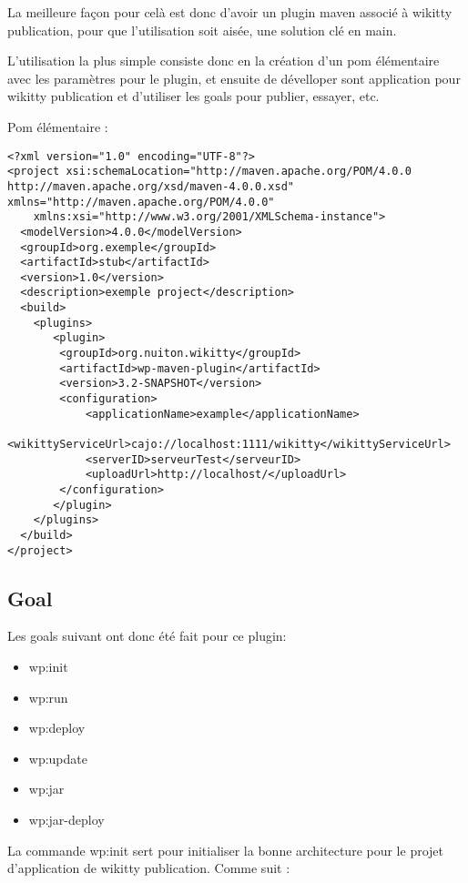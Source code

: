 La meilleure façon pour celà est donc d'avoir un plugin maven associé à 
wikitty publication, pour que l'utilisation soit aisée, une solution clé en 
main.

L'utilisation la plus simple consiste donc en la création d'un pom élémentaire
avec les paramètres pour le plugin, et ensuite de dévelloper sont application
pour wikitty publication et d'utiliser les goals pour publier, essayer, etc.

Pom élémentaire :

\begin{lstlisting}
<?xml version="1.0" encoding="UTF-8"?>
<project xsi:schemaLocation="http://maven.apache.org/POM/4.0.0 http://maven.apache.org/xsd/maven-4.0.0.xsd" xmlns="http://maven.apache.org/POM/4.0.0"
    xmlns:xsi="http://www.w3.org/2001/XMLSchema-instance">
  <modelVersion>4.0.0</modelVersion>
  <groupId>org.exemple</groupId>
  <artifactId>stub</artifactId>
  <version>1.0</version>
  <description>exemple project</description>
  <build>
	<plugins>
	   <plugin>
		<groupId>org.nuiton.wikitty</groupId>
		<artifactId>wp-maven-plugin</artifactId>
		<version>3.2-SNAPSHOT</version>
		<configuration>
			<applicationName>example</applicationName>
			<wikittyServiceUrl>cajo://localhost:1111/wikitty</wikittyServiceUrl>
			<serverID>serveurTest</serveurID>
			<uploadUrl>http://localhost/</uploadUrl>
		</configuration>
	   </plugin>
	</plugins>
  </build>
</project>
\end{lstlisting}


\subsection{Goal}

Les goals suivant ont donc été fait pour ce plugin:

\begin{itemize}
\item wp:init
\item wp:run
\item wp:deploy
\item wp:update
\item wp:jar
\item wp:jar-deploy
\end{itemize}

La commande wp:init sert pour initialiser la bonne architecture pour le projet
d'application de wikitty publication. Comme suit :

